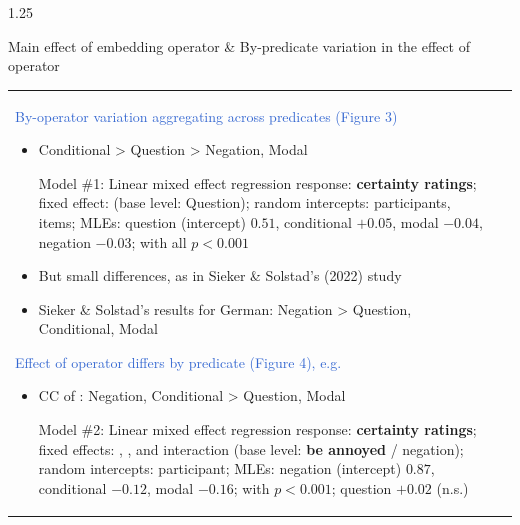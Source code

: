 \documentclass[final]{beamer}
\newlength{\colwidth}
\newlength{\mboxpreadjust}
\begin{document}
\begin{frame}[t]
\begin{columns}[t]
		\begin{column}{1.25\colwidth}
			\begin{normalbox}{Main effect of embedding operator \& By-predicate variation in the effect of operator}
				\hspace{-.2cm}\begin{tabular}{p{.70\linewidth} p{.3\linewidth}}
					\textcolor{highlight}{\large \Raleway By-operator variation aggregating across predicates (Figure 3)}
					\begin{itemize}
						\item Conditional > Question > Negation, Modal
							\vspace{\mboxpreadjust}
							\begin{modelbox}{Model \#1: Linear mixed effect regression}
								\footnotesize
								response: \textbf{certainty ratings}; fixed effect: \ophighlight{\textbf{operator}} (base level: Question);
								random intercepts: participants, items; \newline
								MLEs: question (intercept) $0.51$, conditional $+0.05$, modal $-0.04$, negation $-0.03$; with all $p < 0.001$
							\end{modelbox}

						\item But small differences, as in Sieker \& Solstad’s (2022) study
						\item Sieker \& Solstad’s results for German: Negation > Question, Conditional, Modal

					\end{itemize}

				\textcolor{highlight}{\large \Raleway Effect of operator differs by predicate (Figure 4), e.g.}
				\begin{itemize}
					\item CC of \predhighlight{be annoyed}: Negation, Conditional > Question, Modal
						\vspace{\mboxpreadjust}
						\begin{modelbox}{Model \#2: Linear mixed effect regression}
							\footnotesize
							response: \textbf{certainty ratings}; fixed effects: \ophighlight{operator}, \predhighlight{predicate}, and interaction (base level: \textbf{be annoyed} / negation); random intercepts: participant; \newline
							MLEs: negation (intercept) $0.87$, conditional $-0.12$, modal $-0.16$; with $p < 0.001$; question $+0.02$ (n.s.)
						\end{modelbox}


\end{itemize}
\end{tabular}
\end{normalbox}
\end{column}
\end{columns}
\end{frame}
\end{document}
